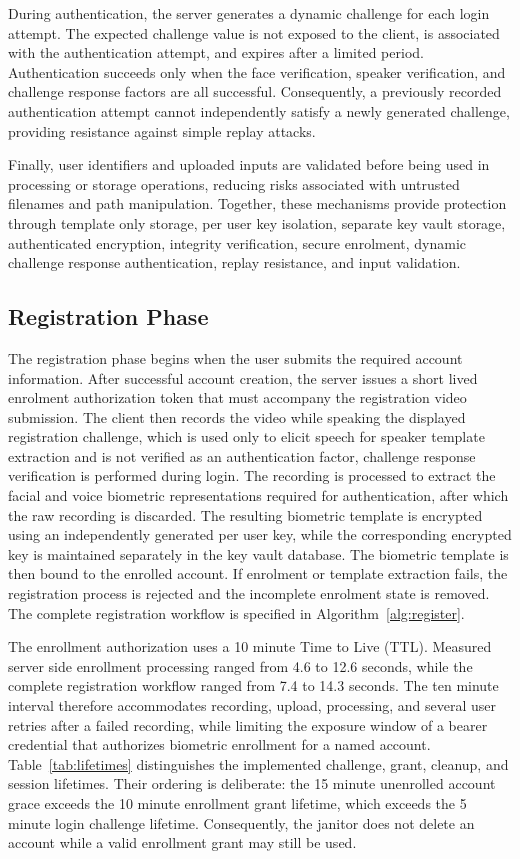 \documentclass[runningheads]{llncs}
\begin{document}
{{During authentication, the server generates a dynamic challenge for each login attempt. The expected challenge value is not exposed to the client, is associated with the authentication attempt, and expires after a limited period. Authentication succeeds only when the face verification, speaker verification, and challenge response factors are all successful. Consequently, a previously recorded authentication attempt cannot independently satisfy a newly generated challenge, providing resistance against simple replay attacks.

Finally, user identifiers and uploaded inputs are validated before being used in processing or storage operations, reducing risks associated with untrusted filenames and path manipulation. Together, these mechanisms provide protection through template only storage, per user key isolation, separate key vault storage, authenticated encryption, integrity verification, secure enrolment, dynamic challenge response authentication, replay resistance, and input validation.
}
}

\subsection{Registration Phase}

The registration phase begins when the user submits the required account information. After successful account creation, the server issues a short lived enrolment authorization token that must accompany the registration video submission. The client then records the video while speaking the displayed registration challenge, which is used only to elicit speech for speaker template extraction and is not verified as an authentication factor, challenge response verification is performed during login. The recording is processed to extract the facial and voice biometric representations required for authentication, after which the raw recording is discarded. The resulting biometric template is encrypted using an independently generated per user key, while the corresponding encrypted key is maintained separately in the key vault database. The biometric template is then bound to the enrolled account. If enrolment or template extraction fails, the registration process is rejected and the incomplete enrolment state is removed. The complete registration workflow is specified in Algorithm~\ref{alg:register}.

The enrollment authorization uses a 10 minute Time to Live (TTL). Measured server side enrollment processing ranged from 4.6 to 12.6 seconds, while the complete registration workflow ranged from 7.4 to 14.3 seconds. The ten minute interval therefore accommodates recording, upload, processing, and several user retries after a failed recording, while limiting the exposure window of a bearer credential that authorizes biometric enrollment for a named account. Table~\ref{tab:lifetimes} distinguishes the implemented challenge, grant, cleanup, and session lifetimes. Their ordering is deliberate: the 15 minute unenrolled account grace exceeds the 10 minute enrollment grant lifetime, which exceeds the 5 minute login challenge lifetime. Consequently, the janitor does not delete an account while a valid enrollment grant may still be used.
\end{document}
